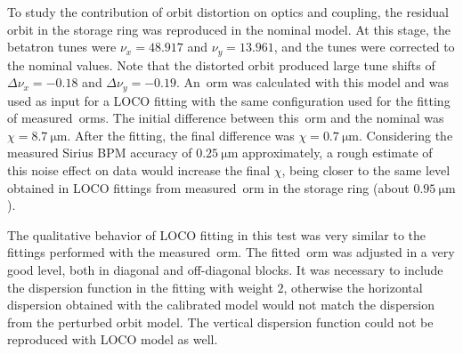 To study the contribution of orbit distortion on optics and coupling, the residual orbit in the storage ring was reproduced in the nominal model. At this stage, the betatron tunes were $\nu_x = 48.917$ and $\nu_y = 13.961$, and the tunes were corrected to the nominal values. Note that the distorted orbit produced large tune shifts of $\Delta \nu_x = -0.18$ and $\Delta \nu_y = -0.19$. An~\gls{orm} was calculated with this model and was used as input for a LOCO fitting with the same configuration used for the fitting of measured~\gls{orm}s. The initial difference between this~\gls{orm} and the nominal was $\chi = \SI{8.7}{\micro\meter}$. After the fitting, the final difference was $\chi = \SI{0.7}{\micro\meter}$. Considering the measured Sirius BPM accuracy of $\SI{0.25}{\micro\meter}$ approximately, a rough estimate of this noise effect on data would increase the final $\chi$, being closer to the same level obtained in LOCO fittings from measured~\gls{orm} in the storage ring (about $\SI{0.95}{\micro\meter}$).

The qualitative behavior of LOCO fitting in this test was very similar to the fittings performed with the measured~\gls{orm}. The fitted~\gls{orm} was adjusted in a very good level, both in diagonal and off-diagonal blocks. It was necessary to include the dispersion function in the fitting with weight $2$, otherwise the horizontal dispersion obtained with the calibrated model would not match the dispersion from the perturbed orbit model. The vertical dispersion function could not be reproduced with LOCO model as well. 

